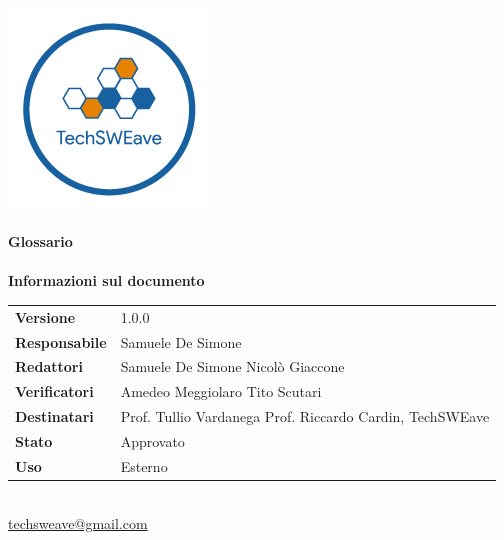 \documentclass[a4paper]{article}
\begin{document}
\begin{titlepage}
    \begin{center}
        \includegraphics{../../../Images/logo}\\
        \vspace{20px}
        \textcolor{logo}{\hrulefill}\\
        \vspace{20px}
        \textbf{\huge\textcolor{logo}{Glossario}}\\
        \vspace{10px}
        \textcolor{logo}{\hrulefill}\\
        \vspace{40px}
        \textbf{\Large Informazioni sul documento}\\
        \vspace{20px}
        \begin{tabular}{p{100px} | p{100px}}
            \textbf{Versione}     & 1.0.0                                                                      \\
            \textbf{Responsabile} & Samuele De Simone                                                          \\
            \textbf{Redattori}    & Samuele De Simone \newline Nicolò Giaccone                                 \\
            \textbf{Verificatori} & Amedeo Meggiolaro \newline Tito Scutari                                    \\
            \textbf{Destinatari}  & Prof. Tullio Vardanega \newline Prof. Riccardo Cardin, \newline TechSWEave \\
            \textbf{Stato}        & Approvato                                                                  \\
            \textbf{Uso}          & Esterno                                                                    \\
        \end{tabular}\\
        \vspace{60px}
        \href{mailto:techsweave@gmail.com}{techsweave@gmail.com}\\

    \end{center}
\end{titlepage}
\end{document}
